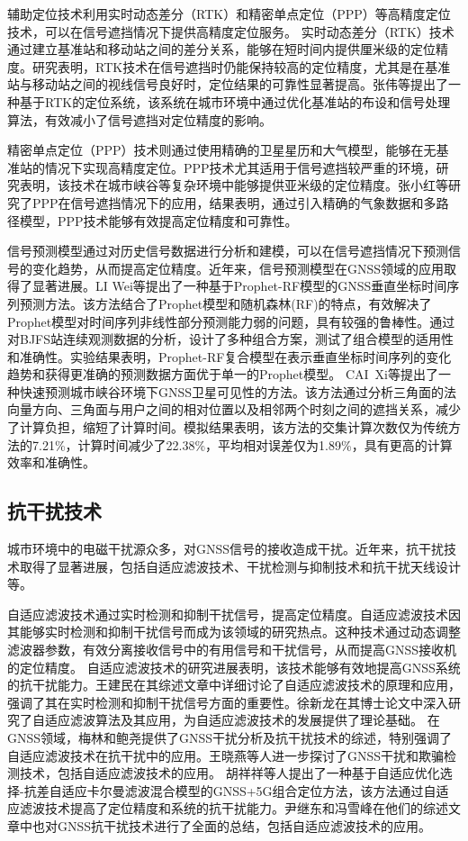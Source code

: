 \documentclass[12pt,hyperref,a4paper,UTF8]{ctexart}
\begin{document}
辅助定位技术利用实时动态差分（RTK）和精密单点定位（PPP）等高精度定位技术，可以在信号遮挡情况下提供高精度定位服务。
实时动态差分（RTK）技术通过建立基准站和移动站之间的差分关系，能够在短时间内提供厘米级的定位精度。研究表明，RTK技术在信号遮挡时仍能保持较高的定位精度，尤其是在基准站与移动站之间的视线信号良好时，定位结果的可靠性显著提高。张伟等\cite{2018zhang}提出了一种基于RTK的定位系统，该系统在城市环境中通过优化基准站的布设和信号处理算法，有效减小了信号遮挡对定位精度的影响。

精密单点定位（PPP）技术则通过使用精确的卫星星历和大气模型，能够在无基准站的情况下实现高精度定位。PPP技术尤其适用于信号遮挡较严重的环境，研究表明，该技术在城市峡谷等复杂环境中能够提供亚米级的定位精度。张小红等\cite{zhangxiaohong}研究了PPP在信号遮挡情况下的应用，结果表明，通过引入精确的气象数据和多路径模型，PPP技术能够有效提高定位精度和可靠性。

信号预测模型通过对历史信号数据进行分析和建模，可以在信号遮挡情况下预测信号的变化趋势，从而提高定位精度。近年来，信号预测模型在GNSS领域的应用取得了显著进展。LI Wei等\cite{10}提出了一种基于Prophet-RF模型的GNSS垂直坐标时间序列预测方法。该方法结合了Prophet模型和随机森林(RF)的特点，有效解决了Prophet模型对时间序列非线性部分预测能力弱的问题，具有较强的鲁棒性。通过对BJFS站连续观测数据的分析，设计了多种组合方案，测试了组合模型的适用性和准确性。实验结果表明，Prophet-RF复合模型在表示垂直坐标时间序列的变化趋势和获得更准确的预测数据方面优于单一的Prophet模型。
CAI\ Xi等\cite{11}提出了一种快速预测城市峡谷环境下GNSS卫星可见性的方法。该方法通过分析三角面的法向量方向、三角面与用户之间的相对位置以及相邻两个时刻之间的遮挡关系，减少了计算负担，缩短了计算时间。模拟结果表明，该方法的交集计算次数仅为传统方法的7.21\%，计算时间减少了22.38\%，平均相对误差仅为1.89\%，具有更高的计算效率和准确性。

\subsection{抗干扰技术}
城市环境中的电磁干扰源众多，对GNSS信号的接收造成干扰。近年来，抗干扰技术取得了显著进展，包括自适应滤波技术、干扰检测与抑制技术和抗干扰天线设计等。

自适应滤波技术通过实时检测和抑制干扰信号，提高定位精度。自适应滤波技术因其能够实时检测和抑制干扰信号而成为该领域的研究热点。这种技术通过动态调整滤波器参数，有效分离接收信号中的有用信号和干扰信号，从而提高GNSS接收机的定位精度。
自适应滤波技术的研究进展表明，该技术能够有效地提高GNSS系统的抗干扰能力。王建民在其综述文章中详细讨论了自适应滤波技术的原理和应用，强调了其在实时检测和抑制干扰信号方面的重要性\cite{王建民2010自适应滤波技术综述}。徐新龙在其博士论文中深入研究了自适应滤波算法及其应用，为自适应滤波技术的发展提供了理论基础\cite{徐新龙0自适应滤波算法及其应用研究}。
在GNSS领域，梅林和鲍尧提供了GNSS干扰分析及抗干扰技术的综述，特别强调了自适应滤波技术在抗干扰中的应用\cite{梅林2021GNSS}。王晓燕等人进一步探讨了GNSS干扰和欺骗检测技术，包括自适应滤波技术的应用\cite{XXCN202312003}。
胡祥祥等人提出了一种基于自适应优化选择-抗差自适应卡尔曼滤波混合模型的GNSS+5G组合定位方法，该方法通过自适应滤波技术提高了定位精度和系统的抗干扰能力\cite{CHTB202407005}。尹继东和冯雪峰在他们的综述文章中也对GNSS抗干扰技术进行了全面的总结，包括自适应滤波技术的应用\cite{尹继东2020GNSS}。
\end{document}
